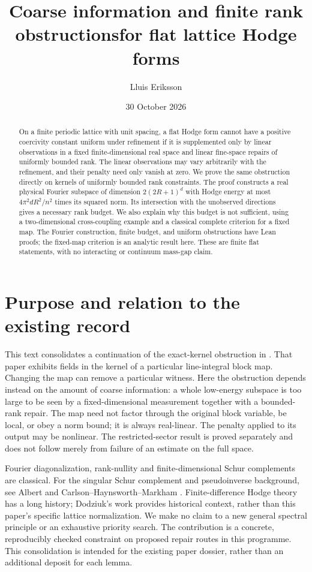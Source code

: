 \documentclass[11pt]{article}
\title{Coarse information and finite rank obstructions\newline for flat lattice Hodge forms}
\author{Lluis Eriksson}
\date{30 October 2026}
\begin{document}
\maketitle
\begin{abstract}
On a finite periodic lattice with unit spacing, a flat Hodge form cannot have
a positive coercivity constant uniform under refinement if it is supplemented
only by linear observations in a fixed finite-dimensional real space and
linear fine-space repairs of uniformly bounded rank. The linear observations
may vary arbitrarily with the
refinement, and their penalty need only vanish at zero. We prove the same
obstruction directly on kernels of uniformly bounded rank constraints.
The proof constructs a real physical Fourier subspace of dimension
$2(2R+1)^d$ with Hodge energy at most $4\pi^2dR^2/n^2$ times its squared norm.
Its intersection with the unobserved directions gives a necessary rank budget.
We also explain why this budget is not sufficient, using a two-dimensional
cross-coupling example and a classical complete criterion for a fixed map.
The Fourier construction, finite budget, and uniform obstructions have Lean
proofs; the fixed-map criterion is an analytic result here. These are finite
flat statements, with no interacting or continuum mass-gap claim.
\end{abstract}

\section{Purpose and relation to the existing record}
This text consolidates a continuation of the exact-kernel obstruction in
\cite{eriksson}. That paper exhibits fields in the kernel of a particular
line-integral block map. Changing the map can remove a particular witness.
Here the obstruction depends instead on the amount of coarse information:
a whole low-energy subspace is too large to be seen by a fixed-dimensional
measurement together with a bounded-rank repair. The map need not factor
through the original block variable, be local, or obey a norm bound; it is
always real-linear. The penalty applied to its output may be nonlinear.
The restricted-sector result is proved separately and does not follow merely
from failure of an estimate on the full space.

Fourier diagonalization, rank-nullity and finite-dimensional Schur complements
are classical. For the singular Schur complement and pseudoinverse background,
see Albert and Carlson--Haynsworth--Markham \cite{albert,carlson}. Finite-difference Hodge theory has a long history; Dodziuk's
work \cite{dodziuk} provides historical context, rather than this paper's
specific lattice normalization. We make no claim to a new general spectral
principle or an exhaustive priority search. The contribution is a concrete,
reproducibly checked constraint on proposed repair routes in this programme.
This consolidation is intended for the existing paper dossier, rather than
an additional deposit for each lemma.
\end{document}
